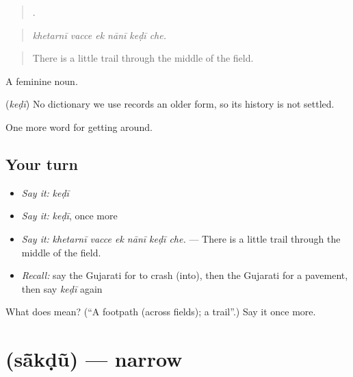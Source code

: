 \begin{quote}
     .
\end{quote}

\begin{quote}
\emph{khetarnī vacce ek nānī keḍī che.}
\end{quote}

\begin{quote}
There is a little trail through the middle of the field.
\end{quote}

A feminine noun.

\begin{cousinweb}
\textbf{} (\emph{keḍī}) No dictionary we use records an older form, so its history is not settled.
\end{cousinweb}

\begin{grammarlens}[title={What you've built}]
One more word for getting around.
\end{grammarlens}

\subsection*{Your turn}
\begin{itemize}
\raggedright
  \item \emph{Say it:} \emph{keḍī}
  \item \emph{Say it:} \emph{keḍī}, once more
  \item \emph{Say it:} \emph{khetarnī vacce ek nānī keḍī che.} — There is a little trail through the middle of the field.
  \item \emph{Recall:} say the Gujarati for to crash (into), then the Gujarati for a pavement, then say \emph{keḍī} again
\end{itemize}

\begin{tcolorbox}[breakable,colback=teal!4,colframe=teal!35!black,title={Before you move on}]
What does  mean? (\textquotedblleft{}A footpath (across fields); a trail\textquotedblright{}.) Say it once more.
\end{tcolorbox}
\section[\texorpdfstring{\gu{સાંકડું} (sā̃kḍũ)}{સાંકડું (sā̃kḍũ)}]{ (sā̃kḍũ) — narrow}

\label{lesson:GU-C404-sakdu}



